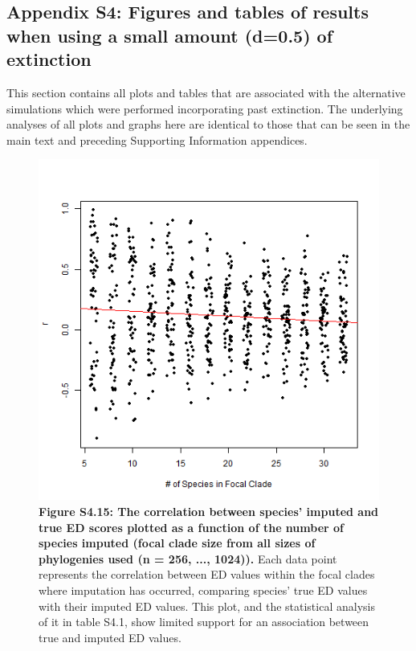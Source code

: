 \documentclass[10pt,english]{article}
\begin{document}
\clearpage
\subsection*{Appendix S4: Figures and tables of results when using a small amount (d=0.5) of extinction}

This section contains all plots and tables that are associated with the
alternative simulations which were performed incorporating past extinction. The
underlying analyses of all plots and graphs here are identical to those that can
be seen in the main text and preceding Supporting Information appendices.  

\begin{figure}[!ht]
  \center
  \includegraphics[width=.5\textwidth]{../figures/edModelLowExtinction.png}
  \caption{\textbf{Figure S4.15: The correlation between species' imputed and
      true ED scores plotted as a function of the number of species imputed
      (focal clade size from all sizes of phylogenies used (n = 256, ...,
      1024)).} Each data point represents the correlation between ED values
      within the focal clades where imputation has occurred, comparing species'
      true ED values with their imputed ED values. This plot, and the
      statistical analysis of it in table S4.1, show limited support for an
      association between true and imputed ED values.}
\end{figure}
\end{document}
